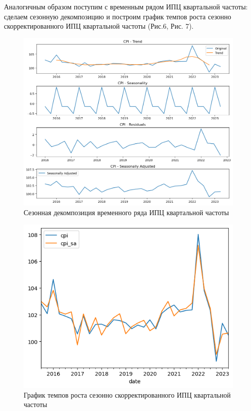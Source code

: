 \documentclass[a4paper, 14pt]{extarticle}
\begin{document}
	Аналогичным образом поступим с временным рядом ИПЦ квартальной частоты: сделаем сезонную декомпозицию и построим график темпов роста сезонно скорректированного ИПЦ квартальной частоты (Рис.6, Рис. 7).
	
	\begin{figure}[tph!]
		\centering
		\includegraphics[scale=0.6]{images/pic_06}
		\caption[Рис. 6]{Сезонная декомпозиция временного ряда ИПЦ квартальной частоты}
		\label{fig:pic06}
	\end{figure}
	
	\begin{figure}[bph!]
		\centering
		\includegraphics[scale=0.8]{images/pic_07}
		\caption[Рис. 7]{График темпов роста сезонно скорректированного ИПЦ квартальной частоты}
		\label{fig:pic07}
	\end{figure}
	
\end{document}
